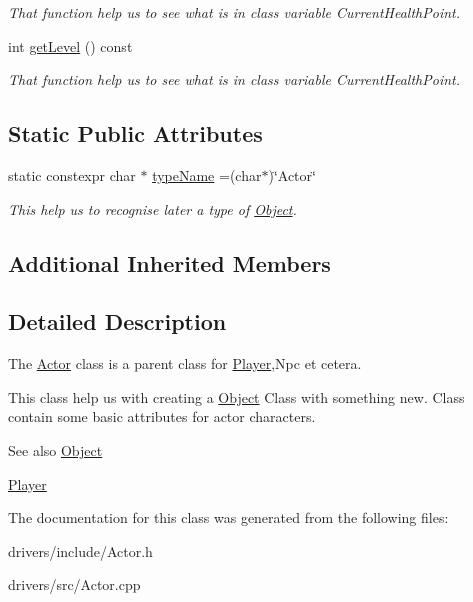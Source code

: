 \begin{DoxyCompactItemize}
\begin{DoxyCompactList}\small\item\em That function help us to see what is in class variable Current\+Health\+Point. \end{DoxyCompactList}\item 
\hypertarget{classActor_ae42874679e670febffa8919497a4fddd}{}int \hyperlink{classActor_ae42874679e670febffa8919497a4fddd}{get\+Level} () const \label{classActor_ae42874679e670febffa8919497a4fddd}

\begin{DoxyCompactList}\small\item\em That function help us to see what is in class variable Current\+Health\+Point. \end{DoxyCompactList}\end{DoxyCompactItemize}
\subsection*{Static Public Attributes}
\begin{DoxyCompactItemize}
\item 
\hypertarget{classActor_a9499766a969b46ad8336d5ae00712fa2}{}static constexpr char $\ast$ \hyperlink{classActor_a9499766a969b46ad8336d5ae00712fa2}{type\+Name} =(char$\ast$)\char`\"{}Actor\char`\"{}\label{classActor_a9499766a969b46ad8336d5ae00712fa2}

\begin{DoxyCompactList}\small\item\em This help us to recognise later a type of \hyperlink{classObject}{Object}. \end{DoxyCompactList}\end{DoxyCompactItemize}
\subsection*{Additional Inherited Members}


\subsection{Detailed Description}
The \hyperlink{classActor}{Actor} class is a parent class for \hyperlink{classPlayer}{Player},Npc et cetera. 

This class help us with creating a \hyperlink{classObject}{Object} Class with something new. Class contain some basic attributes for actor characters.

\begin{DoxySeeAlso}{See also}
\hyperlink{classObject}{Object} 

\hyperlink{classPlayer}{Player} 
\end{DoxySeeAlso}


The documentation for this class was generated from the following files\+:\begin{DoxyCompactItemize}
\item 
drivers/include/Actor.\+h\item 
drivers/src/Actor.\+cpp\end{DoxyCompactItemize}
